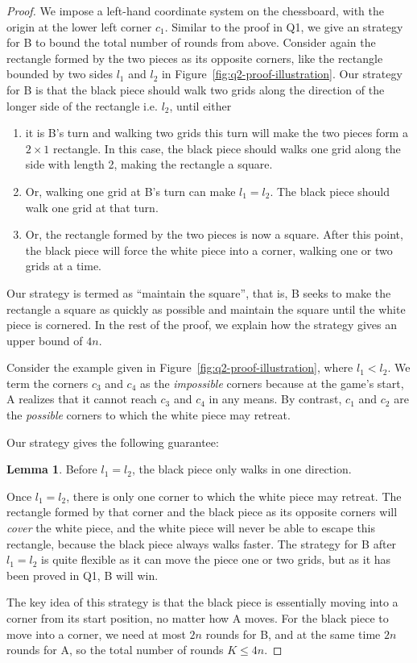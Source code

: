 \documentclass[a4paper]{article}
\theoremstyle{definition}
\newtheorem{lemma}{Lemma}
\begin{document}
\begin{proof}
    We impose a left-hand coordinate system on the chessboard, with the origin
    at the lower left corner $c_1$. Similar to the proof in Q1, we give an
    strategy for B to bound the total number of rounds from above. Consider
    again the rectangle formed by the two pieces as its opposite corners, like
    the rectangle bounded by two sides $l_1$ and $l_2$ in
    Figure~\ref{fig:q2-proof-illustration}. Our strategy for B is that the black
    piece should walk two grids along the direction of the longer side of the
    rectangle i.e. $l_2$, until either
    \begin{enumerate}
        \item it is B's turn and walking two grids this turn will make the two
        pieces form a $2 \times 1$ rectangle. In this case, the black piece
        should walks one grid along the side with length 2, making the rectangle
        a square.
        \item Or, walking one grid at B's turn can make $l_1 = l_2$. The black
        piece should walk one grid at that turn.
        \item Or, the rectangle formed by the two pieces is now a square. After
        this point, the black piece will force the white piece into a corner,
        walking one or two grids at a time.
    \end{enumerate}

    Our strategy is termed as ``maintain the square'', that is, B seeks to make
    the rectangle a square as quickly as possible and maintain the square until
    the white piece is cornered. In the rest of the proof, we explain how the
    strategy gives an upper bound of $4n$.

    Consider the example given in Figure~\ref{fig:q2-proof-illustration}, where
    $l_1 < l_2$. We term the corners $c_3$ and $c_4$ as the \emph{impossible}
    corners because at the game's start, A realizes that it cannot reach $c_3$
    and $c_4$ in any means. By contrast, $c_1$ and $c_2$ are the \emph{possible}
    corners to which the white piece may retreat.

    Our strategy gives the following guarantee:
    \begin{lemma}
        Before $l_1 = l_2$, the black piece only walks in one direction.
    \end{lemma}

    Once $l_1 = l_2$, there is only one corner to which the white piece may
    retreat. The rectangle formed by that corner and the black piece as its
    opposite corners will \emph{cover} the white piece, and the white piece will
    never be able to escape this rectangle, because the black piece always walks
    faster. The strategy for B after $l_1 = l_2$ is quite flexible as it can
    move the piece one or two grids, but as it has been proved in Q1, B will
    win.

    The key idea of this strategy is that the black piece is essentially moving
    into a corner from its start position, no matter how A moves. For the black
    piece to move into a corner, we need at most $2n$ rounds for B, and at the
    same time $2n$ rounds for A, so the total number of rounds $K \leq 4n$.
\end{proof}
\end{document}
